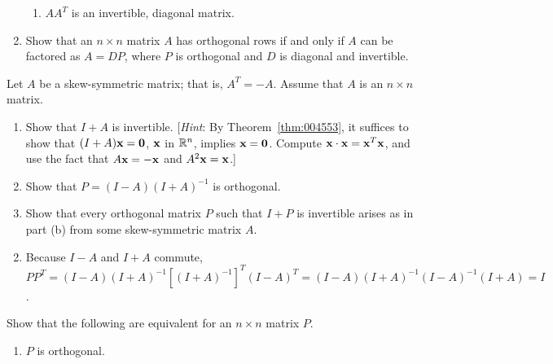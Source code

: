 \begin{multicols}{2}
\begin{ex}
\begin{enumerate}[label={\alph*.}]
\begin{enumerate}[label={\roman*.}]
\item $AA^{T}$ is an invertible, diagonal matrix.

\end{enumerate}
\item Show that an $n \times n$ matrix $A$ has orthogonal rows if and only if $A$ can be factored as $A = DP$, where $P$ is orthogonal and $D$ is diagonal and invertible.

\end{enumerate}
\end{ex}

\begin{ex}
Let $A$ be a skew-symmetric matrix; that is, $A^{T} = -A$. Assume that $A$ is an $n \times n$ matrix.


\begin{enumerate}[label={\alph*.}]
\item Show that $I + A$ is invertible. [\textit{Hint}: By Theorem~\ref{thm:004553}, it suffices to show that $(I + A)\textbf{x} = \textbf{0}$, $\textbf{x}$ in $\mathbb{R}^n$, implies $\textbf{x} = \textbf{0}$. Compute $\textbf{x} \cdot \textbf{x} = \textbf{x}^{T}\textbf{x}$, and use the fact that $A\textbf{x} = -\textbf{x}$ and $A^{2}\textbf{x} = \textbf{x}$.]

\item Show that $P = (I - A)(I + A)^{-1}$ is orthogonal.

\item Show that every orthogonal matrix $P$ such that $I + P$ is invertible arises as in part (b) from some skew-symmetric matrix $A$. \newline [\textit{Hint}: Solve $P = (I - A)(I + A)^{-1}$ for $A$.]

\end{enumerate}
\begin{sol}
\begin{enumerate}[label={\alph*.}]
\setcounter{enumi}{1}
\item  Because $I - A$ and $I + A$ commute, $PP^{T} = (I - A)(I + A)^{-1}[(I + A)^{-1}]^{T}(I - A)^{T} = (I - A)(I + A)^{-1}(I - A)^{-1}(I + A) = I$.

\end{enumerate}
\end{sol}
\end{ex}

\begin{ex}
Show that the following are equivalent for an $n \times n$ matrix $P$.


\begin{enumerate}[label={\alph*.}]
\item $P$ is orthogonal.


\end{enumerate}
\end{ex}
\end{multicols}

